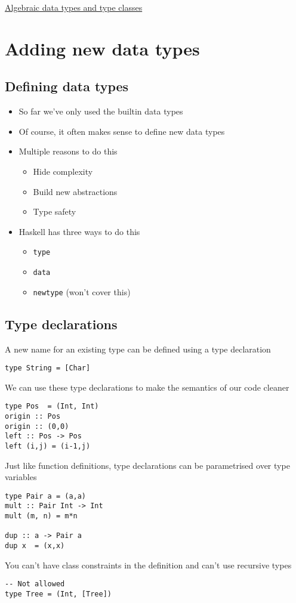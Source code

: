 \documentclass{article}[18pt]
\begin{document}
\begin{center}
\underline{\huge Algebraic data types and type classes}
\end{center}
\section{Adding new data types}
\subsection{Defining data types}
\begin{itemize}
	\item So far we've only used the builtin data types
	\item Of course, it often makes sense to define new data types
	\item Multiple reasons to do this
	\begin{itemize}
		\item Hide complexity
		\item Build new abstractions
		\item Type safety
	\end{itemize}
	\item Haskell has three ways to do this
	\begin{itemize}
		\item \texttt{type}
		\item \texttt{data}
		\item \texttt{newtype} (won't cover this)
	\end{itemize}
\end{itemize}
\subsection{Type declarations}
A new name for an existing type can be defined using a type declaration
\begin{verbatim}
type String = [Char]
\end{verbatim}
We can use these type declarations to make the semantics of our code cleaner
\begin{verbatim}
type Pos  = (Int, Int)
origin :: Pos
origin :: (0,0)
left :: Pos -> Pos
left (i,j) = (i-1,j)
\end{verbatim}
Just like function definitions, type declarations can be parametrised over type variables
\begin{verbatim}
type Pair a = (a,a)
mult :: Pair Int -> Int
mult (m, n) = m*n

dup :: a -> Pair a
dup x  = (x,x)
\end{verbatim}
You can't have class constraints in the definition and can't use recursive types
\begin{verbatim}
-- Not allowed
type Tree = (Int, [Tree])
\end{verbatim}
\end{document}
